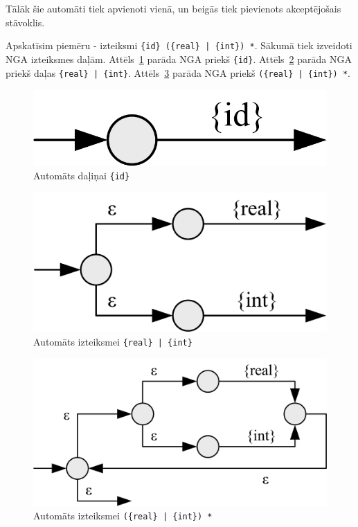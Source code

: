 Tālāk šie automāti tiek apvienoti vienā, un beigās tiek pievienots akceptējošais stāvoklis.

Apskatīsim piemēru - izteiksmi \verb/{id} ({real} | {int}) */. Sākumā tiek izveidoti NGA izteiksmes daļām. Attēls~\ref{fig:auto_token_id} parāda NGA priekš \verb|{id}|. Attēls~\ref{fig:auto_or_ex} parāda NGA priekš daļas \verb/{real} | {int}/. Attēls~\ref{fig:auto_asterisk_ex} parāda NGA priekš \verb/({real} | {int}) */.

\begin{figure}[H]
  \centering
    \includegraphics[scale=1.5]{pictures/auto_token_id}
  \caption{\label{fig:auto_token_id}Automāts daļiņai \texttt{\{id\}}}
\end{figure}

\begin{figure}[H]
  \centering
    \includegraphics[scale=1.5]{pictures/auto_or_ex}
  \caption{\label{fig:auto_or_ex}Automāts izteiksmei \texttt{\{real\} | \{int\}}}
\end{figure}

\begin{figure}[H]
  \centering
    \includegraphics[scale=1.5]{pictures/auto_asterisk_ex}
  \caption{\label{fig:auto_asterisk_ex}Automāts izteiksmei \texttt{(\{real\} | \{int\}) *}}
\end{figure}

